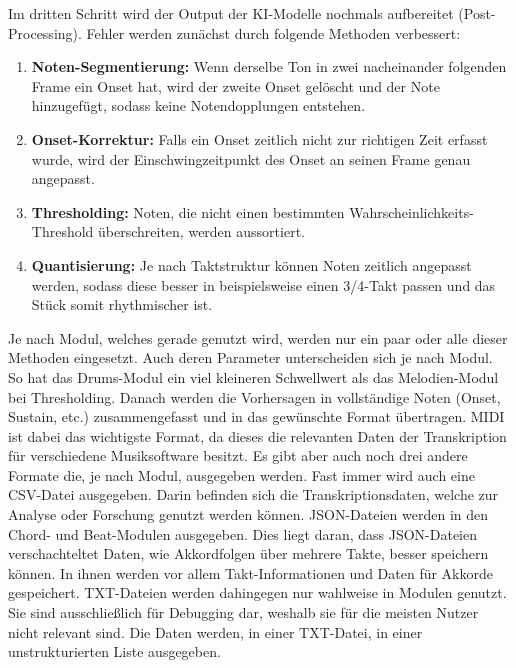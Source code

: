 Im dritten Schritt wird der Output der KI-Modelle nochmals aufbereitet (Post-Processing).
Fehler werden zunächst durch folgende Methoden verbessert:
\begin{enumerate}
    \item \textbf{Noten-Segmentierung:} Wenn derselbe Ton in zwei nacheinander folgenden Frame ein Onset hat, wird der zweite Onset gelöscht und der Note hinzugefügt, sodass keine Notendopplungen entstehen.
    \item \textbf{Onset-Korrektur:} Falls ein Onset zeitlich nicht zur richtigen Zeit erfasst wurde, wird der Einschwingzeitpunkt des Onset an seinen Frame genau angepasst.
    \item \textbf{Thresholding:} Noten, die nicht einen bestimmten Wahrscheinlichkeits-Threshold überschreiten, werden aussortiert.
    \item \textbf{Quantisierung:} Je nach Taktstruktur können Noten zeitlich angepasst werden, sodass diese besser in beispielsweise einen 3/4-Takt passen und das Stück somit rhythmischer ist.
\end{enumerate}
Je nach Modul, welches gerade genutzt wird, werden nur ein paar oder alle dieser Methoden eingesetzt.
Auch deren Parameter unterscheiden sich je nach Modul.
So hat das Drums-Modul ein viel kleineren Schwellwert als das Melodien-Modul bei Thresholding.
Danach werden die Vorhersagen in vollständige Noten (Onset, Sustain, etc.)
zusammengefasst und in das gewünschte Format übertragen.
MIDI ist dabei das wichtigste Format, da dieses die relevanten Daten der Transkription für verschiedene Musiksoftware besitzt.
Es gibt aber auch noch drei andere Formate die, je nach Modul, ausgegeben werden.
Fast immer wird auch eine CSV-Datei ausgegeben.
Darin befinden sich die Transkriptionsdaten, welche zur Analyse oder Forschung genutzt werden können.
JSON-Dateien werden in den Chord- und Beat-Modulen ausgegeben.
Dies liegt daran, dass JSON-Dateien verschachteltet Daten, wie Akkordfolgen über mehrere Takte, besser speichern können.
In ihnen werden vor allem Takt-Informationen und Daten für Akkorde gespeichert.
TXT-Dateien werden dahingegen nur wahlweise in Modulen genutzt.
Sie sind ausschließlich für Debugging dar, weshalb sie für die meisten Nutzer nicht relevant sind.
Die Daten werden, in einer TXT-Datei, in einer unstrukturierten Liste ausgegeben.

